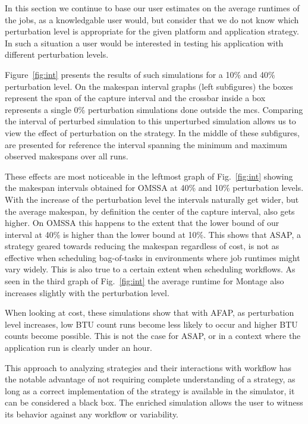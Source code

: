 \documentclass[10pt,conference,compsocconf]{IEEEtran}
\begin{document}
In this section we  continue to base our user estimates  on the average runtimes
of the  jobs, as a  knowledgable user  would, but consider  that we do  not know
which perturbation  level is appropriate for the given platform  and application
strategy.   In such  a  situation a  user  would be  interested  in testing  his
application with different perturbation levels.

Figure~\ref{fig:int} presents  the results  of such simulations  for a  10\% and
40\% perturbation level.  On the  makespan interval graphs (left subfigures) the
boxes represent the span  of the capture interval and the  crossbar inside a box
represents   a   single   0\%   perturbation  simulations   done   outside   the
\ac{mcs}. Comparing  the interval  of perturbed  simulation to  this unperturbed
simulation allows us to view the effect  of perturbation on the strategy. In the
middle of these subfigures,  are presented  for  reference the  interval 
spanning  the minimum and maximum observed makespans over all runs.

These effects are most noticeable in the leftmost graph of Fig.~\ref{fig:int}
showing the makespan intervals obtained for OMSSA at 40\% and 10\% perturbation
levels. With the increase of the perturbation level the intervals naturally get 
wider, but the average makespan, by definition the center of the capture 
interval, also gets higher. On OMSSA this happens to the extent that the lower 
bound of our interval at 40\% is higher than the lower bound at 10\%.
This shows that ASAP, a strategy geared towards reducing the makespan regardless
of cost, is not as effective when scheduling bag-of-tasks in environments where
job runtimes might vary widely.  This is also true to a certain extent when
scheduling workflows. As seen in the third graph of Fig.~\ref{fig:int} the
average runtime for Montage also increases slightly with the perturbation level.

When looking at cost, these simulations show that with AFAP, as
perturbation level increases, low BTU count runs become less likely to occur and
higher BTU counts become possible. This is not the case for ASAP, or in a 
context where the application run is clearly under an hour.

This approach to analyzing strategies and their interactions with workflow has
the notable advantage of not requiring complete understanding of a strategy, as
long as a correct implementation of the strategy is available in the simulator,
it can be considered a black box. The enriched simulation allows the user to
witness its behavior against any workflow or variability.
\end{document}

